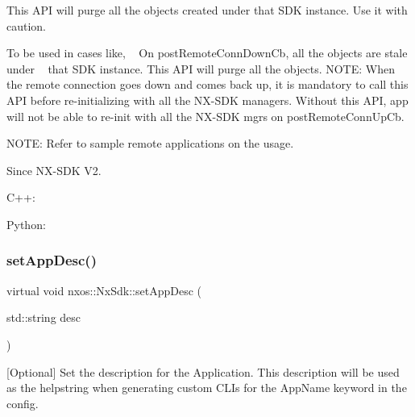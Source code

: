 This A\+PI will purge all the objects created under that S\+DK instance. Use it with caution.

To be used in cases like, ~\newline
 On post\+Remote\+Conn\+Down\+Cb, all the objects are stale under ~\newline
 that S\+DK instance. This A\+PI will purge all the objects. N\+O\+TE\+: When the remote connection goes down and comes back up, it is mandatory to call this A\+PI before re-\/initializing with all the N\+X-\/\+S\+DK managers. Without this A\+PI, app will not be able to re-\/init with all the N\+X-\/\+S\+DK mgrs on post\+Remote\+Conn\+Up\+Cb.

N\+O\+TE\+: Refer to sample remote applications on the usage.

\begin{DoxySince}{Since}
N\+X-\/\+S\+DK V2. ~\newline
 
\begin{DoxyCode}
C++:                                                
                                                  
Python:                                         
\end{DoxyCode}
 
\end{DoxySince}
\mbox{\label{classnxos_1_1_nx_sdk_a2c6007a383114285951b2d2a062dacec}} 
\subsubsection{\texorpdfstring{set\+App\+Desc()}{setAppDesc()}}
{\footnotesize\ttfamily virtual void nxos\+::\+Nx\+Sdk\+::set\+App\+Desc (\begin{DoxyParamCaption}\item[{std\+::string}]{desc }\end{DoxyParamCaption})\hspace{0.3cm}{\ttfamily [pure virtual]}}

\mbox{[}Optional\mbox{]} Set the description for the Application. This description will be used as the helpstring when generating custom C\+L\+Is for the App\+Name keyword in the config. \mbox{\label{classnxos_1_1_nx_sdk_a46d9487216506aa19e5499759f5eaef7}} 
